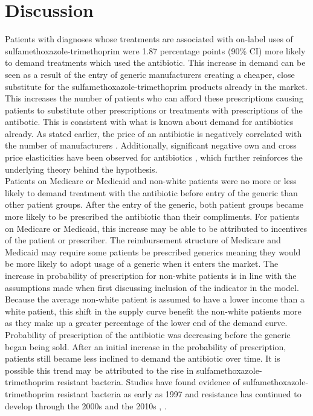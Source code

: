 \chapter{Discussion}
\indent Patients with diagnoses whose treatments are associated with on-label uses of sulfamethoxazole-trimethoprim were 1.87 percentage points (90\% CI) more likely to demand treatments which used the antibiotic. This increase in demand can be seen as a result of the entry of generic manufacturers creating a cheaper, close substitute for the sulfamethoxazole-trimethoprim products already in the market. This increases the number of patients who can afford these prescriptions causing patients to substitute other prescriptions or treatments with prescriptions of the antibotic. This is consistent with what is known about demand for antibiotics already. As stated earlier, the price of an antibiotic is negatively correlated with the number of manufacturers \cite{alpern_trends_2017}. Additionally, significant negative own and cross price elasticities have been observed for antibiotics \cite{kaier_impact_2013}, \cite{kianmehr_system_2020} which further reinforces the underlying theory behind the hypothesis.\\
\indent Patients on Medicare or Medicaid and non-white patients were no more or less likely to demand treatment with the antibiotic before entry of the generic than other patient groups. After the entry of the generic, both patient groups became more likely to be prescribed the antibiotic than their compliments. For patients on Medicare or Medicaid, this increase may be able to be attributed to incentives of the patient or prescriber. The reimbursement structure of Medicare and Medicaid may require some patients be prescribed generics meaning they would be more likely to adopt usage of a generic when it enters the market. The increase in probability of prescription for non-white patients is in line with the assumptions made when first discussing inclusion of the indicator in the model. Because the average non-white patient is assumed to have a lower income than a white patient, this shift in the supply curve benefit the non-white patients more as they make up a greater percentage of the lower end of the demand curve.\\
\indent Probability of prescription of the antibiotic was decreasing before the generic began being sold. After an initial increase in the probability of prescription, patients still became less inclined to demand the antibiotic over time. It is possible this trend may be attributed to the rise in sulfamethoxazole-trimethoprim resistant bacteria. Studies have found evidence of sulfamethoxazole-trimethoprim resistant bacteria as early as 1997 \cite{gales_urinary_2002} and resistance has continued to develop through the 2000s and the 2010s \cite{noauthor_resistance_nodate}, \cite{khamash_increasing_2019}.
